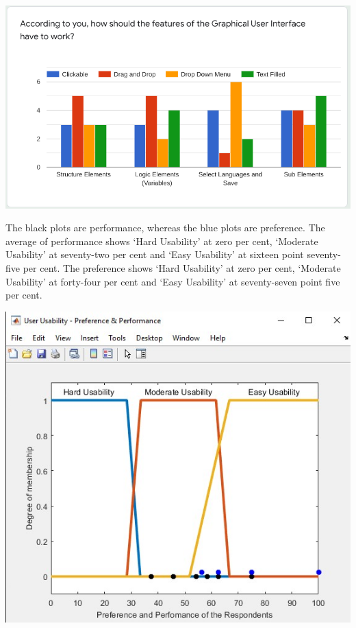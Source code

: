 \documentclass[a0,portrait]{a0poster}
\begin{document}
\begin{multicols}{2}
\begin{center}\vspace{1cm}
\includegraphics[width=0.55\linewidth]{../../Showcase-Work_Completed/Surveying/q11.png}
\label{fig:q-11}
\end{center}\vspace{1cm}

The black plots are performance, whereas the blue plots are preference. The average of performance shows `Hard Usability' at zero per cent, `Moderate Usability' at seventy-two per cent and `Easy Usability' at sixteen point seventy-five per cent. The preference shows `Hard Usability' at zero per cent, `Moderate Usability' at forty-four per cent and `Easy Usability' at seventy-seven point five per cent.

\begin{center}\vspace{1cm}
    \includegraphics[width=0.45\linewidth]{FuzzyLogicPrefPerf.jpg}
    \label{fig:fuzzyLogicPrefPerf}
\end{center}\vspace{1cm}


\end{multicols}
\end{document}
